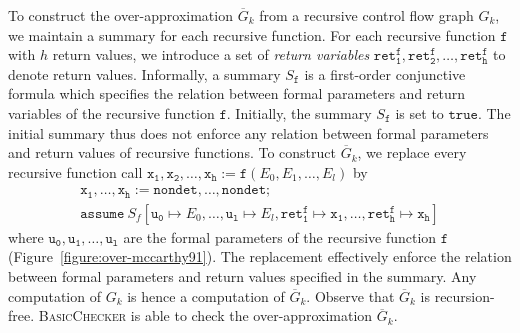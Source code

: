 To construct the over-approximation $\overline{G}_k$ from a
recursive control flow graph $G_k$, we maintain a summary for each
recursive function. For each recursive function $\mathtt{f}$ with $h$
return values, we introduce a set of \emph{return variables} 
$\mathtt{ret^f_1}, \mathtt{ret^f_2}, \ldots, \mathtt{ret^f_h}$ to
denote return values. Informally, a summary $S_{\mathtt{f}}$ is a
first-order 
conjunctive formula which specifies the relation between formal
parameters and return variables of the recursive function
$\mathtt{f}$. Initially, the summary $S_{\mathtt{f}}$ is set to
$\mathtt{true}$. The initial summary thus does not enforce any
relation between formal parameters and return values of recursive
functions. To construct $\overline{G}_k$, we replace every recursive
function call $\mathtt{x_1}, \mathtt{x_2}, \ldots, \mathtt{x_h} :=
\mathtt{f} (E_0, E_1, \ldots, E_l)$ by 
\begin{equation*}
  \begin{array}{l}
    \mathtt{x_1}, \ldots, \mathtt{x_h} :=
    \mathtt{nondet}, \ldots, \mathtt{nondet};\\
    \mathtt{assume}\ S_f[\mathtt{u_0} \mapsto E_0, \ldots, 
    \mathtt{u_l} \mapsto E_l, 
    \mathtt{ret^f_1} \mapsto \mathtt{x_1}, \ldots,
    \mathtt{ret^f_h} \mapsto \mathtt{x_h}]
  \end{array}
\end{equation*}
where $\mathtt{u_0}, \mathtt{u_1}, \ldots, \mathtt{u_l}$
are the formal parameters of the recursive function
$\mathtt{f}$ (Figure~\ref{figure:over-mccarthy91}).
The replacement effectively enforce the relation between formal
parameters and return values specified in the summary. Any computation
of $G_k$ is hence a computation of $\overline{G}_k$. Observe that
$\overline{G}_k$ is recursion-free. \textsc{BasicChecker} is able to
check the over-approximation $\overline{G}_k$.

